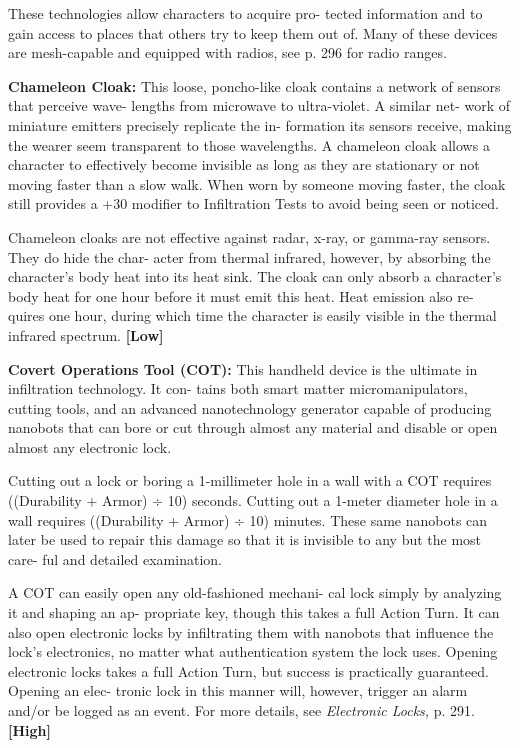 These technologies allow characters to acquire pro-
tected information and to gain access to places that 
others try to keep them out of. Many of these devices 
are mesh-capable and equipped with radios, see p. 296 
for radio ranges.

\textbf{Chameleon Cloak: }This loose, poncho-like cloak 
contains a network of sensors that perceive wave-
lengths from microwave to ultra-violet. A similar net-
work of miniature emitters precisely replicate the in-
formation its sensors receive, making the wearer seem 
transparent to those wavelengths. A chameleon cloak 
allows a character to effectively become invisible as 
long as they are stationary or not moving faster than 
a slow walk. When worn by someone moving faster, 
the cloak still provides a +30 modifier to Infiltration 
Tests to avoid being seen or noticed.

Chameleon cloaks are not effective against radar, 
x-ray, or gamma-ray sensors. They do hide the char-
acter from thermal infrared, however, by absorbing 
the character's body heat into its heat sink. The cloak 
can only absorb a character's body heat for one hour 
before it must emit this heat. Heat emission also re-
quires one hour, during which time the character is 
easily visible in the thermal infrared spectrum. \textbf{[Low]}

\textbf{Covert Operations Tool (COT): }This handheld 
device is the ultimate in infiltration technology. It con-
tains both smart matter micromanipulators, cutting 
tools, and an advanced nanotechnology generator 
capable of producing nanobots that can bore or cut 
through almost any material and disable or open 
almost any electronic lock.

Cutting out a lock or boring a 1-millimeter hole in 
a wall with a COT requires ((Durability + Armor) ÷ 
10) seconds. Cutting out a 1-meter diameter hole in 
a wall requires ((Durability + Armor) ÷ 10) minutes. 
These same nanobots can later be used to repair this 
damage so that it is invisible to any but the most care-
ful and detailed examination.

A COT can easily open any old-fashioned mechani-
cal lock simply by analyzing it and shaping an ap-
propriate key, though this takes a full Action Turn. 
It can also open electronic locks by infiltrating them 
with nanobots that influence the lock's electronics, 
no matter what authentication system the lock uses. 
Opening electronic locks takes a full Action Turn, but 
success is practically guaranteed. Opening an elec-
tronic lock in this manner will, however, trigger an 
alarm and/or be logged as an event. For more details, 
see \textit{Electronic Locks,} p. 291. \textbf{[High]}

